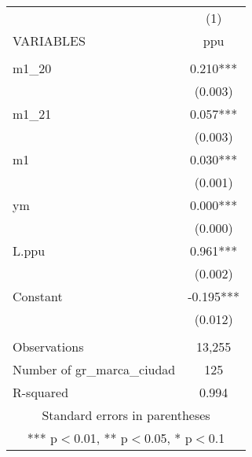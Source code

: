 \begin{tabular}{lc} \hline
 & (1) \\
VARIABLES & ppu \\ \hline
 &  \\
m1\_20 & 0.210*** \\
 & (0.003) \\
m1\_21 & 0.057*** \\
 & (0.003) \\
m1 & 0.030*** \\
 & (0.001) \\
ym & 0.000*** \\
 & (0.000) \\
L.ppu & 0.961*** \\
 & (0.002) \\
Constant & -0.195*** \\
 & (0.012) \\
 &  \\
Observations & 13,255 \\
Number of gr\_marca\_ciudad & 125 \\
 R-squared & 0.994 \\ \hline
\multicolumn{2}{c}{ Standard errors in parentheses} \\
\multicolumn{2}{c}{ *** p$<$0.01, ** p$<$0.05, * p$<$0.1} \\
\end{tabular}
